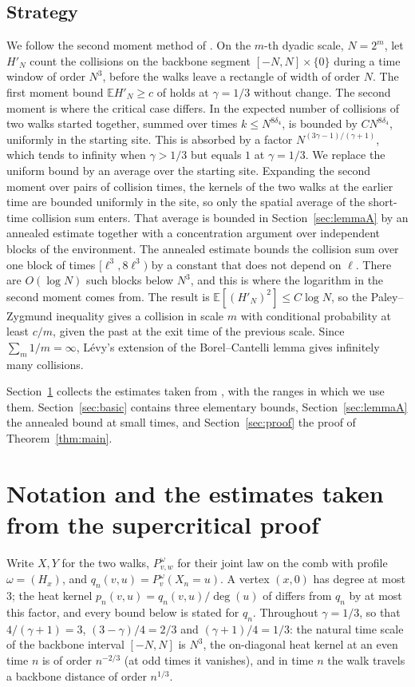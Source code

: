 \documentclass[11pt]{amsart}
\theoremstyle{remark}
\numberwithin{equation}{section}
\newcommand{\EE}{\mathbb{E}}
\begin{document}
\subsection*{Strategy}
We follow the second moment method of \cite{DNNS}. On the $m$-th dyadic scale, $N=2^m$, let $H'_N$ count the collisions on the backbone segment $[-N,N]\times\{0\}$ during a time window of order $N^3$, before the walks leave a rectangle of width of order $N$. The first moment bound $\EE H'_N\ge c$ of \cite{DNNS} holds at $\gamma=1/3$ without change. The second moment is where the critical case differs. In \cite{DNNS} the expected number of collisions of two walks started together, summed over times $k\le N^{8\delta_4}$, is bounded by $CN^{8\delta_4}$, uniformly in the starting site. This is absorbed by a factor $N^{(3\gamma-1)/(\gamma+1)}$, which tends to infinity when $\gamma>1/3$ but equals $1$ at $\gamma=1/3$. We replace the uniform bound by an average over the starting site. Expanding the second moment over pairs of collision times, the kernels of the two walks at the earlier time are bounded uniformly in the site, so only the spatial average of the short-time collision sum enters. That average is bounded in Section~\ref{sec:lemmaA} by an annealed estimate together with a concentration argument over independent blocks of the environment. The annealed estimate bounds the collision sum over one block of times $[\ell^3,8\ell^3)$ by a constant that does not depend on $\ell$. There are $O(\log N)$ such blocks below $N^3$, and this is where the logarithm in the second moment comes from. The result is $\EE[(H'_N)^2]\le C\log N$, so the Paley--Zygmund inequality gives a collision in scale $m$ with conditional probability at least $c/m$, given the past at the exit time of the previous scale. Since $\sum_m 1/m=\infty$, L\'evy's extension of the Borel--Cantelli lemma gives infinitely many collisions.

Section~\ref{sec:prelim} collects the estimates taken from \cite{DNNS}, with the ranges in which we use them. Section~\ref{sec:basic} contains three elementary bounds, Section~\ref{sec:lemmaA} the annealed bound at small times, and Section~\ref{sec:proof} the proof of Theorem~\ref{thm:main}.

\section{Notation and the estimates taken from the supercritical proof}\label{sec:prelim}
Write $X,Y$ for the two walks, $P^\omega_{v,w}$ for their joint law on the comb with profile $\omega=(H_x)$, and $q_n(v,u)=P^\omega_v(X_n=u)$. A vertex $(x,0)$ has degree at most $3$; the heat kernel $p_n(v,u)=q_n(v,u)/\deg(u)$ of \cite{DNNS} differs from $q_n$ by at most this factor, and every bound below is stated for $q_n$. Throughout $\gamma=1/3$, so that $4/(\gamma+1)=3$, $(3-\gamma)/4=2/3$ and $(\gamma+1)/4=1/3$: the natural time scale of the backbone interval $[-N,N]$ is $N^3$, the on-diagonal heat kernel at an even time $n$ is of order $n^{-2/3}$ (at odd times it vanishes), and in time $n$ the walk travels a backbone distance of order $n^{1/3}$.
\end{document}

